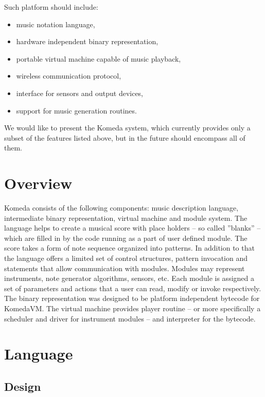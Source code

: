 \documentclass{article}
\begin{document}
Such platform should include:
\begin{itemize}
  \item music notation language,
  \item hardware independent binary representation,
  \item portable virtual machine capable of music playback,
  \item wireless communication protocol,
  \item interface for sensors and output devices,
  \item support for music generation routines.
\end{itemize}

We would like to present the Komeda system, which currently provides only a
subset of the features listed above, but in the future should encompass all of
them. 

\section{Overview} 
\label{overview}

Komeda consists of the following components: music description language,
intermediate binary representation, virtual machine and module system. The
language helps to create a musical score with place holders -- so called
''blanks'' -- which are filled in by the code running as a part of user defined
module.  The score takes a form of note sequence organized into patterns.  In
addition to that the language offers a limited set of control structures,
pattern invocation and statements that allow communication with modules.
Modules may represent instruments, note generator algorithms, sensors, etc.
Each module is assigned a set of parameters and actions that a user can read,
modify or invoke respectively.  The binary representation was designed to be
platform independent bytecode for KomedaVM.  The virtual machine provides
player routine -- or more specifically a scheduler and driver for instrument
modules -- and interpreter for the bytecode.

\section{Language}
\label{lang}

\subsection{Design}
\label{lang:design}
\end{document}
